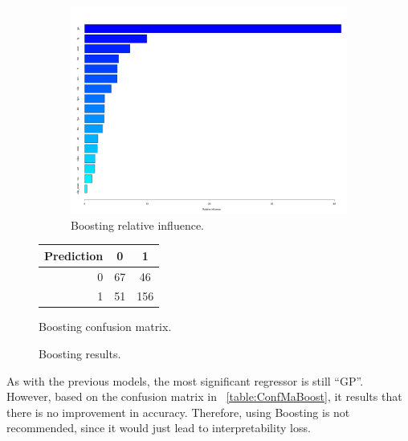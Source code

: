 \begin{figure}[H]
	\centering
	\begin{subfigure}{0.5\textwidth}
		\centering
		\includegraphics[width=0.6\linewidth]{ImageFiles/Classification/Trees/boost_4_rel_inf_best.pdf}
		\caption{Boosting relative influence.}
		\label{fig:boost_4_rel_inf}
	\end{subfigure}%
	\hfill
	\begin{subtable}[h]{0.5\textwidth}
		\centering
		\begin{tabular}{|| cr | cc ||}    
			\hline
			\multicolumn{2}{|c|}{Prediction} 
			& 0 & 1 \\
			\hline
			& 0 & 67 & 46 \\
			& 1 & 51 & 156 \\
			\hline
		\end{tabular}
		\caption{Boosting confusion matrix.}
		\label{table:ConfMaBoost}
	\end{subtable}
	\caption{Boosting results.}
	\label{BoostRes}
\end{figure}
As with the previous models, the most significant regressor is still ``GP''. However, based on the confusion matrix in \Tab~\ref{table:ConfMaBoost}, it results that there is no improvement in accuracy. Therefore, using Boosting is not recommended, since it would just lead to interpretability loss.

